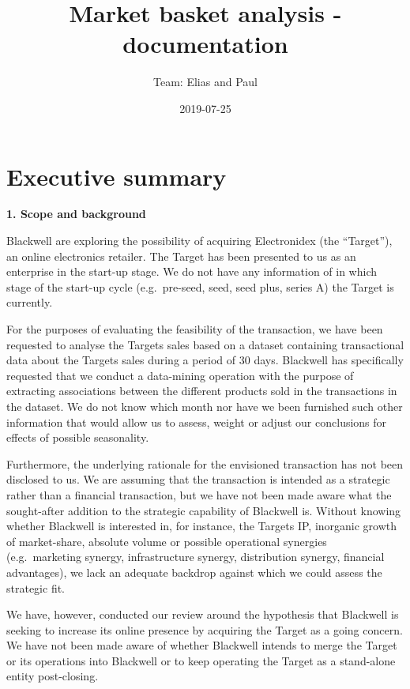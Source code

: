 \documentclass[]{article}
\title{\textbf{Market basket analysis - documentation}}
\subtitle{Team: Elias and Paul}
\author{}
\date{2019-07-25}
\begin{document}
\maketitle

\hypertarget{executive-summary}{%
\section{Executive summary}\label{executive-summary}}

\textbf{1. Scope and background}

Blackwell are exploring the possibility of acquiring Electronidex (the
``Target''), an online electronics retailer. The Target has been
presented to us as an enterprise in the start-up stage. We do not have
any information of in which stage of the start-up cycle (e.g.~pre-seed,
seed, seed plus, series A) the Target is currently.

For the purposes of evaluating the feasibility of the transaction, we
have been requested to analyse the Targets sales based on a dataset
containing transactional data about the Targets sales during a period of
30 days. Blackwell has specifically requested that we conduct a
data-mining operation with the purpose of extracting associations
between the different products sold in the transactions in the dataset.
We do not know which month nor have we been furnished such other
information that would allow us to assess, weight or adjust our
conclusions for effects of possible seasonality.

Furthermore, the underlying rationale for the envisioned transaction has
not been disclosed to us. We are assuming that the transaction is
intended as a strategic rather than a financial transaction, but we have
not been made aware what the sought-after addition to the strategic
capability of Blackwell is. Without knowing whether Blackwell is
interested in, for instance, the Targets IP, inorganic growth of
market-share, absolute volume or possible operational synergies
(e.g.~marketing synergy, infrastructure synergy, distribution synergy,
financial advantages), we lack an adequate backdrop against which we
could assess the strategic fit.

We have, however, conducted our review around the hypothesis that
Blackwell is seeking to increase its online presence by acquiring the
Target as a going concern. We have not been made aware of whether
Blackwell intends to merge the Target or its operations into Blackwell
or to keep operating the Target as a stand-alone entity post-closing.
\end{document}

